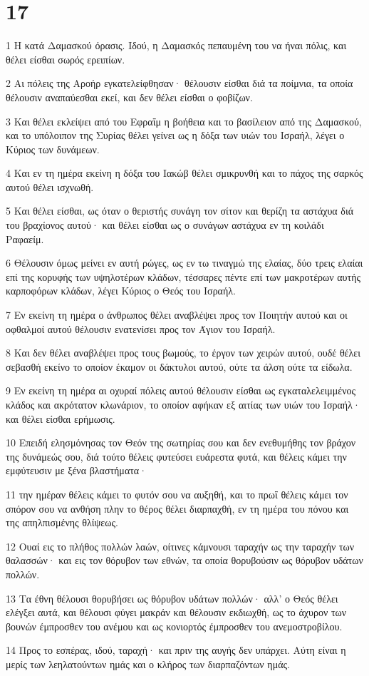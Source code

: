 \chapter{17}

\par 1 Η κατά Δαμασκού όρασις. Ιδού, η Δαμασκός πεπαυμένη του να ήναι πόλις, και θέλει είσθαι σωρός ερειπίων.
\par 2 Αι πόλεις της Αροήρ εγκατελείφθησαν· θέλουσιν είσθαι διά τα ποίμνια, τα οποία θέλουσιν αναπαύεσθαι εκεί, και δεν θέλει είσθαι ο φοβίζων.
\par 3 Και θέλει εκλείψει από του Εφραΐμ η βοήθεια και το βασίλειον από της Δαμασκού, και το υπόλοιπον της Συρίας θέλει γείνει ως η δόξα των υιών του Ισραήλ, λέγει ο Κύριος των δυνάμεων.
\par 4 Και εν τη ημέρα εκείνη η δόξα του Ιακώβ θέλει σμικρυνθή και το πάχος της σαρκός αυτού θέλει ισχνωθή.
\par 5 Και θέλει είσθαι, ως όταν ο θεριστής συνάγη τον σίτον και θερίζη τα αστάχυα διά του βραχίονος αυτού· και θέλει είσθαι ως ο συνάγων αστάχυα εν τη κοιλάδι Ραφαείμ.
\par 6 Θέλουσιν όμως μείνει εν αυτή ρώγες, ως εν τω τιναγμώ της ελαίας, δύο τρεις ελαίαι επί της κορυφής των υψηλοτέρων κλάδων, τέσσαρες πέντε επί των μακροτέρων αυτής καρποφόρων κλάδων, λέγει Κύριος ο Θεός του Ισραήλ.
\par 7 Εν εκείνη τη ημέρα ο άνθρωπος θέλει αναβλέψει προς τον Ποιητήν αυτού και οι οφθαλμοί αυτού θέλουσιν ενατενίσει προς τον Άγιον του Ισραήλ.
\par 8 Και δεν θέλει αναβλέψει προς τους βωμούς, το έργον των χειρών αυτού, ουδέ θέλει σεβασθή εκείνο το οποίον έκαμον οι δάκτυλοι αυτού, ούτε τα άλση ούτε τα είδωλα.
\par 9 Εν εκείνη τη ημέρα αι οχυραί πόλεις αυτού θέλουσιν είσθαι ως εγκαταλελειμμένος κλάδος και ακρότατον κλωνάριον, το οποίον αφήκαν εξ αιτίας των υιών του Ισραήλ· και θέλει είσθαι ερήμωσις.
\par 10 Επειδή ελησμόνησας τον Θεόν της σωτηρίας σου και δεν ενεθυμήθης τον βράχον της δυνάμεώς σου, διά τούτο θέλεις φυτεύσει ευάρεστα φυτά, και θέλεις κάμει την εμφύτευσιν με ξένα βλαστήματα·
\par 11 την ημέραν θέλεις κάμει το φυτόν σου να αυξηθή, και το πρωΐ θέλεις κάμει τον σπόρον σου να ανθήση πλην το θέρος θέλει διαρπαχθή, εν τη ημέρα του πόνου και της απηλπισμένης θλίψεως.
\par 12 Ουαί εις το πλήθος πολλών λαών, οίτινες κάμνουσι ταραχήν ως την ταραχήν των θαλασσών· και εις τον θόρυβον των εθνών, τα οποία θορυβούσιν ως θόρυβον υδάτων πολλών.
\par 13 Τα έθνη θέλουσι θορυβήσει ως θόρυβον υδάτων πολλών· αλλ' ο Θεός θέλει ελέγξει αυτά, και θέλουσι φύγει μακράν και θέλουσιν εκδιωχθή, ως το άχυρον των βουνών έμπροσθεν του ανέμου και ως κονιορτός έμπροσθεν του ανεμοστροβίλου.
\par 14 Προς το εσπέρας, ιδού, ταραχή· και πριν της αυγής δεν υπάρχει. Αύτη είναι η μερίς των λεηλατούντων ημάς και ο κλήρος των διαρπαζόντων ημάς.

